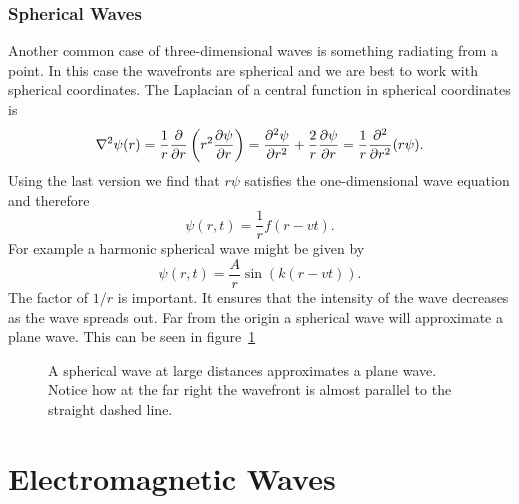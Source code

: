     \subsubsection{Spherical Waves}
    Another common case of three-dimensional waves is something radiating from a point.
    In this case the wavefronts are spherical and we are best to work with spherical coordinates.
    The Laplacian of a central function in spherical coordinates is
    \[\nabla^2\psi(r) = \frac{1}{r}\pdv{r}\left(r^2\pdv{\psi}{r}\right) = \pdv[2]{\psi}{r} + \frac{2}{r}\pdv{\psi}{r} = \frac{1}{r}\pdv[2]{r}(r\psi).\]
    Using the last version we find that \(r\psi\) satisfies the one-dimensional wave equation and therefore
    \[\psi(r, t) = \frac{1}{r}f(r - vt).\]
    For example a harmonic spherical wave might be given by
    \begin{equation}\label{eqn:harmonic spherical wave}
        \psi(r, t) = \frac{A}{r}\sin(k(r - vt)).
    \end{equation}
    The factor of \(1/r\) is important.
    It ensures that the intensity of the wave decreases as the wave spreads out.
    Far from the origin a spherical wave will approximate a plane wave.
    This can be seen in figure~\ref{fig:spherical wave approx plane wave}
    \begin{figure}[ht]
        \centering
        \caption{A spherical wave at large distances approximates a plane wave. Notice how at the far right the wavefront is almost parallel to the straight dashed line.}
        \label{fig:spherical wave approx plane wave}
    \end{figure}

    \section{Electromagnetic Waves}
